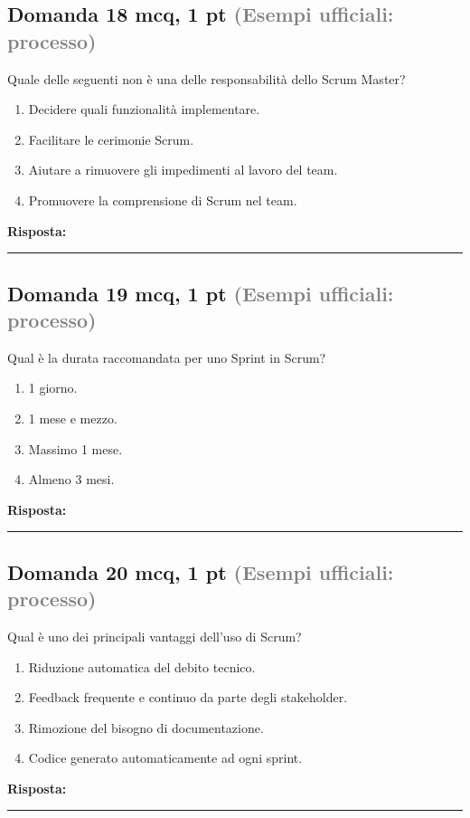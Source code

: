 \documentclass[a4paper,11pt]{article}
\begin{document}
\subsection*{Domanda 18 \hfill {\small mcq, 1 pt \textcolor{gray}{(Esempi ufficiali: processo)}}}
Quale delle seguenti non è una delle responsabilità dello Scrum Master?

\begin{enumerate}[label=\alph*)]
\item Decidere quali funzionalità implementare.
\item Facilitare le cerimonie Scrum.
\item Aiutare a rimuovere gli impedimenti al lavoro del team.
\item Promuovere la comprensione di Scrum nel team.
\end{enumerate}
\vspace{0.2cm}
\noindent\textbf{Risposta:}\par
\vspace{1.5cm}\hrule


\subsection*{Domanda 19 \hfill {\small mcq, 1 pt \textcolor{gray}{(Esempi ufficiali: processo)}}}
Qual è la durata raccomandata per uno Sprint in Scrum?

\begin{enumerate}[label=\alph*)]
\item 1 giorno.
\item 1 mese e mezzo.
\item Massimo 1 mese.
\item Almeno 3 mesi.
\end{enumerate}
\vspace{0.2cm}
\noindent\textbf{Risposta:}\par
\vspace{1.5cm}\hrule


\subsection*{Domanda 20 \hfill {\small mcq, 1 pt \textcolor{gray}{(Esempi ufficiali: processo)}}}
Qual è uno dei principali vantaggi dell'uso di Scrum?

\begin{enumerate}[label=\alph*)]
\item Riduzione automatica del debito tecnico.
\item Feedback frequente e continuo da parte degli stakeholder.
\item Rimozione del bisogno di documentazione.
\item Codice generato automaticamente ad ogni sprint.
\end{enumerate}
\vspace{0.2cm}
\noindent\textbf{Risposta:}\par
\vspace{1.5cm}\hrule
\end{document}
